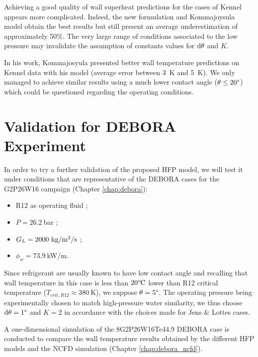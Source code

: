 \npar

Achieving a good quality of wall superheat predictions for the cases of Kennel appears more complicated. Indeed, the new formulation and Kommajoysula model obtain the best results but still present an average underestimation of approximately 50\%. The very large range of conditions associated to the low pressure may invalidate the assumption of constants values for $\mathrm{d}\theta$ and $K$. 


\begin{remark*}{}
In his work, Kommajosyula \cite{kommajosyula_development_2020} presented better wall temperature predictions on Kennel data with his model (average error between 3\ K and 5\ K). We only managed to achieve similar results using a much lower contact angle ($\theta \leq 20\degree$) which could be questioned regarding the operating conditions.
\end{remark*}


\section{Validation for DEBORA Experiment}
\label{sec:hfp_valid_debora}

In order to try a further validation of the proposed HFP model, we will test it under conditions that are representative of the DEBORA cases for the G2P26W16 campaign (Chapter \ref{chap:debora}):


\begin{itemize}
\item R12 as operating fluid ;
\item $P=26.2\ $bar ;
\item $G_{L} = 2000~\text{kg/m$^{2}$/s}$ ;
\item $\phi_{w} = 73.9\ $kW/m.
\end{itemize}


Since refrigerant are usually known to have low contact angle and recalling that wall temperature in this case is less than $20\degree\mathrm{C}$ lower than R12 critical temperature ($T_{crit,R12} \approx 380\ $K), we suppose $\theta = 5 \degree$. The operating pressure being experimentally chosen to match high-pressure water similarity, we thus choose $\mathrm{d}\theta = 1 \degree$ and $K = 2$ in accordance with the choices made for Jens \& Lottes cases.

\npar

A one-dimensional simulation of the 8G2P26W16Te44.9 DEBORA case is conducted to compare the wall temperature results obtained by the different HFP models and the NCFD simulation (Chapter \ref{chap:debora_ncfd}).


